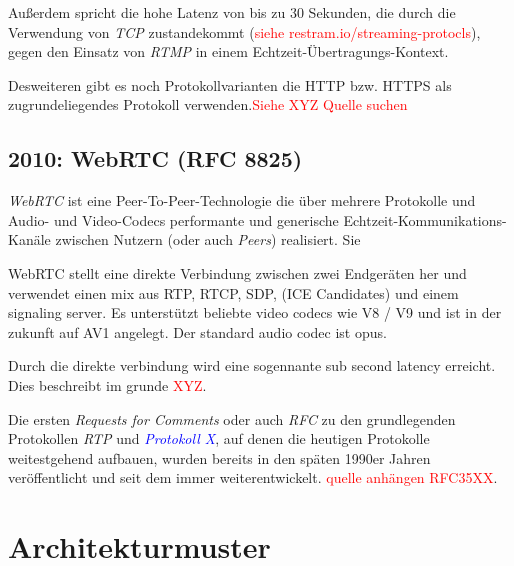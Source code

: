 \documentclass{IEEEtran}
\begin{document}
\begin{twocolumn}
Außerdem spricht die hohe Latenz von bis zu 30 Sekunden, die durch die
Verwendung von \textit{TCP} zustandekommt (\textcolor{red}{siehe
restram.io/streaming-protocls}), gegen den Einsatz von \textit{RTMP} in einem
Echtzeit-Übertragungs-Kontext.

Desweiteren gibt es noch Protokollvarianten die HTTP bzw. HTTPS als zugrundeliegendes
Protokoll verwenden.\textcolor{red}{Siehe XYZ Quelle suchen}

\subsection{2010: WebRTC (RFC 8825)}

\textit{WebRTC} ist eine Peer-To-Peer-Technologie die über mehrere Protokolle
und Audio- und Video-Codecs performante und generische
Echtzeit-Kommunikations-Kanäle zwischen Nutzern (oder auch \textit{Peers})
realisiert. Sie 

WebRTC stellt eine direkte Verbindung zwischen zwei Endgeräten her und
verwendet einen mix aus RTP, RTCP, SDP, (ICE Candidates) und einem signaling
server. Es unterstützt beliebte video codecs wie V8 / V9 und ist in der zukunft 
auf AV1 angelegt. Der standard audio codec ist opus.

Durch die direkte verbindung wird eine sogennante sub second latency erreicht.
Dies beschreibt im grunde \textcolor{red}{XYZ}.





Die ersten \textit{Requests for Comments} oder auch \textit{RFC} zu
den grundlegenden Protokollen \textit{RTP} und
\textit{\textcolor{blue}{Protokoll X}}, auf denen die heutigen Protokolle
weitestgehend aufbauen, wurden bereits in den späten 1990er Jahren
veröffentlicht und seit dem immer weiterentwickelt. \textcolor{red}{quelle
anhängen RFC35XX}.

\section{Architekturmuster}


\end{twocolumn}
\end{document}

